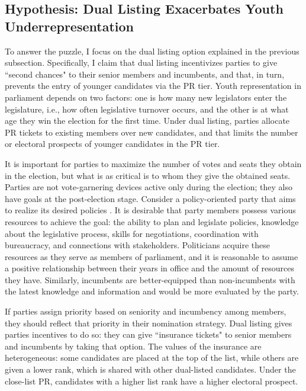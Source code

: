 \documentclass[a4paper, 11pt]{article}
\begin{document}
\subsection{Hypothesis: Dual Listing Exacerbates Youth Underrepresentation}

To answer the puzzle, I focus on the dual listing option explained in the previous subsection. Specifically, I claim that dual listing incentivizes parties to give ``second chances" to their senior members and incumbents, and that, in turn, prevents the entry of younger candidates via the PR tier. Youth representation in parliament depends on two factors: one is how many new legislators enter the legislature, i.e., how often legislative turnover occurs, and the other is at what age they win the election for the first time. Under dual listing, parties allocate PR tickets to existing members over new candidates, and that limits the number or electoral prospects of younger candidates in the PR tier. 

It is important for parties to maximize the number of votes and seats they obtain in the election, but what is as critical is to whom they give the obtained seats. Parties are not vote-garnering devices active only during the election; they also have goals at the post-election stage. Consider a policy-oriented party that aims to realize its desired policies \citep{strom_policy_1999}. It is desirable that party members possess various resources to achieve the goal: the ability to plan and legislate policies, knowledge about the legislative process, skills for negotiations, coordination with bureaucracy, and connections with stakeholders. Politicians acquire these resources as they serve as members of parliament, and it is reasonable to assume a positive relationship between their years in office and the amount of resources they have. Similarly, incumbents are better-equipped than non-incumbents with the latest knowledge and information and would be more evaluated by the party. 

If parties assign priority based on seniority and incumbency among members, they should reflect that priority in their nomination strategy. Dual listing gives parties incentives to do so: they can give ``insurance tickets" to senior members and incumbents by taking that option. The values of the insurance are heterogeneous: some candidates are placed at the top of the list, while others are given a lower rank, which is shared with other dual-listed candidates. Under the close-list PR, candidates with a higher list rank have a higher electoral prospect. 
\end{document}
